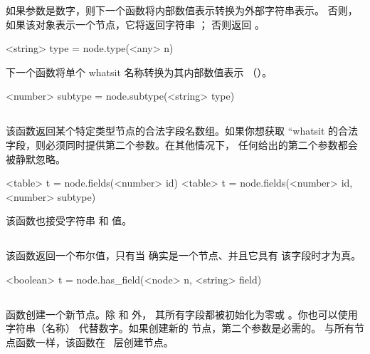 如果参数是数字，则下一个函数将内部数值表示转换为外部字符串表示。
否则，如果该对象表示一个节点，它将返回字符串 ；
否则返回 。

\begin{typing}
<string> type =
    node.type(<any> n)
\end{typing}

下一个函数将单个 whatsit 名称转换为其内部数值表示
（）。

\begin{typing}
<number> subtype =
    node.subtype(<string> type)
\end{typing}

\subsection{}


该函数返回某个特定类型节点的合法字段名数组。如果你想获取
``whatsit 的合法字段，则必须同时提供第二个参数。在其他情况下，
任何给出的第二个参数都会被静默忽略。

\begin{typing}
<table> t =
    node.fields(<number> id)
<table> t =
    node.fields(<number> id, <number> subtype)
\end{typing}

该函数也接受字符串  和  值。

\subsection{}


该函数返回一个布尔值，只有当  确实是一个节点、并且它具有
该字段时才为真。

\begin{typing}
<boolean> t =
    node.has_field(<node> n, <string> field)
\end{typing}

\subsection{}


 函数创建一个新节点。除  和  外，
其所有字段都被初始化为零或 。你也可以使用字符串（名称）
代替数字。如果创建新的  节点，第二个参数是必需的。
与所有节点函数一样，该函数在 \TEX\ 层创建节点。

